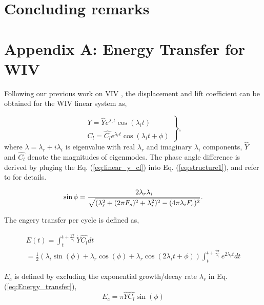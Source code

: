 \section{Concluding remarks}




\section*{Appendix A: Energy Transfer for WIV}\label{app:A} 

Following our previous work on VIV \cite{yao_jfm_1}, 
the displacement and lift coefficient can be obtained  for the WIV linear system as, 
 
\begin{equation}
\left. \begin{array}{ll}
\displaystyle Y=\hat{Y} e^{\lambda_r t}\cos(\lambda_i t)  \\[8pt]
\displaystyle C_l=\hat{C_l} e^{\lambda_r t}\cos(\lambda_i t + \phi)
\end{array}\right\},
\label{eq:linear_y_cl}
\end{equation}
where $\lambda=\lambda_r+i\lambda_i$ is eigenvalue with real $\lambda_r$ 
and imaginary $\lambda_i$ components, $\hat{Y}$ and $\hat{C_l}$ 
denote the magnitudes of eigenmodes. The phase angle difference is derived 
by pluging the Eq. (\ref{eq:linear_y_cl}) into Eq. (\ref{eq:structure1}), and refer
to \cite{yao_jfm_1} for details. 

\begin{equation}
\sin{\phi} = \frac{2\lambda_r\lambda_i}{\sqrt{(\lambda_r^2  \\
+ (2\pi F_s)^2 + \lambda_i^2)^2 - (4\pi\lambda_i F_s)^2 }}.
\label{eq:phase_angle}
\end{equation}

The engery transfer per cycle is defined as,

\begin{equation}
\begin{array}{ll}
\displaystyle E(t) = \int_{t}^{t+\frac{2 \pi}{\lambda_i}} \dot{Y} \hat{C_l} dt \\
\displaystyle  = \frac{1}{2}(\lambda_i \sin(\phi) + \lambda_r \cos(\phi) + \lambda_r \cos(2 \lambda_i t + \phi))
\int_{t}^{t+\frac{2 \pi}{\lambda_i}} e^{2 \lambda_r t} dt
\end{array}
\label{eq:Energy_transfer}
\end{equation}

$E_c$ is defined by excluding the exponential growth/decay rate $\lambda_r$ in Eq. (\ref{eq:Energy_transfer}),
\begin{equation}
E_c = \pi \hat{Y} \hat{C_l} \sin(\phi)
\end{equation}


